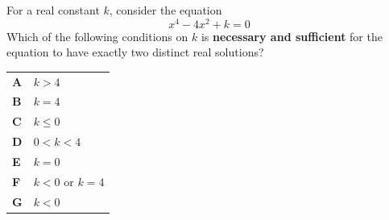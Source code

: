\documentclass[11pt,a4paper]{article}
\begin{document}
\thispagestyle{djspaper}
\djsFrontMatter
\thispagestyle{djspaper}
\vspace*{8pt}
\begin{enumerate}[label=\textbf{\arabic*.},leftmargin=*,itemsep=0pt,start=1]
\questionitem[Polynomials]
For a real constant $k$, consider the equation \[ x^4-4x^2+k=0 \] Which of the following conditions on $k$ is \textbf{necessary and sufficient} for the equation to have exactly two distinct real solutions?

\par\vspace*{12pt}
\begin{tabularx}{\linewidth}{@{}>{\bfseries}l Y@{}}
A &
$k>4$
\\[0.8em]
B &
$k=4$
\\[0.8em]
C &
$k\leq0$
\\[0.8em]
D &
$0<k<4$
\\[0.8em]
E &
$k=0$
\\[0.8em]
F &
$k<0$ or $k=4$
\\[0.8em]
G &
$k<0$
\\
\end{tabularx}
\end{enumerate}
\clearpage
\thispagestyle{djspaper}
\vspace*{8pt}
\end{document}
